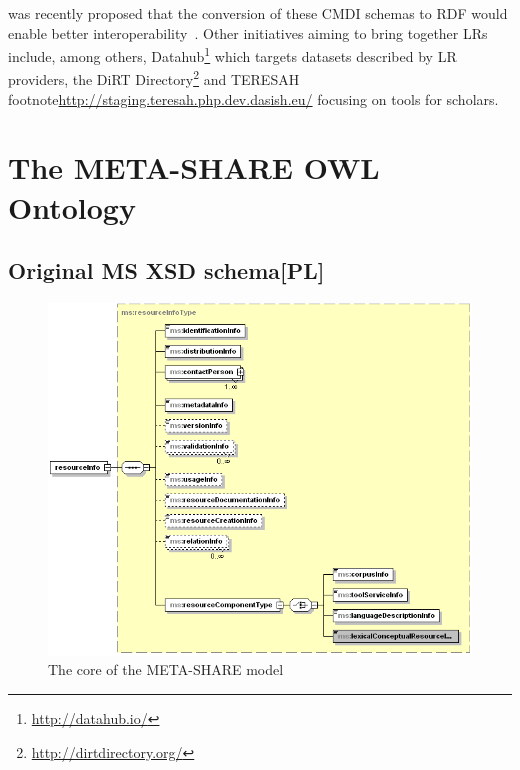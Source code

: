 \documentclass{llncs}
\begin{document}
was recently proposed that the conversion of these CMDI schemas to RDF would
enable better interoperability~\cite{durco2014clarin}.
Other initiatives aiming to bring together LRs include, among others,
Datahub\footnote{\url{http://datahub.io/}} which targets datasets described by
LR providers, the DiRT Directory\footnote{\url{http://dirtdirectory.org/}} and
TERESAH footnote{\url{http://staging.teresah.php.dev.dasish.eu/}} focusing on
tools for scholars.

\section{The META-SHARE OWL Ontology}
\label{sec:ontology}
\subsection{Original MS XSD schema[PL]}
\label{sec:xsd}

\begin{figure}
    \centering
    \includegraphics[width=.8\textwidth]{figure_resource.png}
    \caption{\label{fig:resource}The core of the META-SHARE model}
\end{figure}
\end{document}
